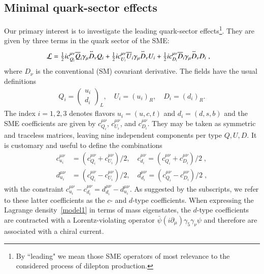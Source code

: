 \subsection{Minimal quark-sector effects}
\label{ssec:canddtype}
%
%
Our primary interest is to investigate the leading
quark-sector effects\footnote{By ``leading" we mean those SME operators
of most relevance to the considered process of dilepton production. 
}.
They are given by three terms in the quark sector of the SME:
%
\begin{align}
\label{model1}
\mathcal{L} &= \tfrac{1}{2}i c_{Q_i}^{\mu\nu}\overline{Q}_i\gamma_\mu\overset{\text{\tiny$\leftrightarrow$}}{D}_\nu Q_i  
+ \tfrac{1}{2}i c_{U_i}^{\mu\nu}\overline{U}_i\gamma_\mu\overset{\text{\tiny$\leftrightarrow$}}{D}_\nu U_i 
 + \tfrac{1}{2}i c_{D_i}^{\mu\nu}\overline{D}_i\gamma_\mu\overset{\text{\tiny$\leftrightarrow$}}{D}_\nu D_i \;,
\end{align}
where $D_\nu$ is the conventional (SM) covariant derivative. 
The fields have the usual definitions
\begin{align}
Q_i = \begin{pmatrix} u_i \\ d_i \end{pmatrix}_L, \quad U_i = \left(u_i\right)_R, \quad D_i = \left(d_i\right)_R.
\end{align}
%
The index $i = 1, 2, 3$ denotes flavors $u_i = (u, c, t)$ and 
$d_i = (d, s, b)$ and the SME coefficients are given 
by $c_{Q_i}^{\mu\nu}$, $c_{U_i}^{\mu\nu}$, and $c_{D_i}^{\mu\nu}$. 
They may be taken as symmetric and traceless matrices, leaving
nine independent components per type $Q, U, D$. 
It is customary and useful to define the combinations
%
\begin{align}
\label{eq:quarkcoeffs}
c_{u_i}^{\mu\nu} &= (c_{Q_i}^{\mu\nu} + c_{U_i}^{\mu\nu})/2, \quad c_{d_i}^{\mu\nu} = (c_{Q_i}^{\mu\nu} + c_{D_i}^{\mu\nu})/2  \;, \nonumber\\
d_{u_i}^{\mu\nu} &= (c_{Q_i}^{\mu\nu} - c_{U_i}^{\mu\nu})/2, \quad d_{d_i}^{\mu\nu} = (c_{Q_i}^{\mu\nu} - c_{D_i}^{\mu\nu})/2  \;,
\end{align}
%
with the constraint $c_{u_i}^{\mu\nu} -c_{d_i}^{\mu\nu} 
= d_{d_i}^{\mu\nu} - d_{u_i}^{\mu\nu}$. As suggested by the subscripts, 
we refer to these latter coefficients as the $c$- and $d$-type coefficients. 
When expressing the Lagrange density~\eqref{model1} in terms of mass eigenstates, 
the $d$-type coefficients are contracted with a Lorentz-violating operator
$\bar\psi(i\partial_\mu)\gamma_5\gamma_\nu \psi$ and therefore are
associated with a chiral current. 
%
%
